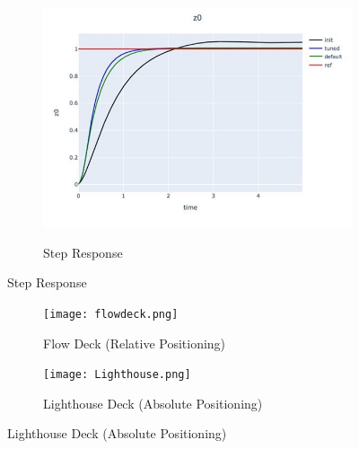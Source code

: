 \documentclass[../templateLTHtwocol.tex]{subfiles}
\begin{document}
\begin{figure}[H]
\begin{subfigure}[b]{0.2\textwidth}
		\label{fig:figpid3}
	\end{subfigure}
	\hfill
	\begin{subfigure}[b]{0.2\textwidth}
		\caption{Step Response}
		\includegraphics[width=\textwidth]{resources/pid/step_response_PID.jpg}
		\label{pid_step_response:fig}
	\end{subfigure}
\end{figure}

\begin{figure}[h]
	\centering
	\caption{Helix - Hardware Results}
	\begin{subfigure}[b]{0.4\textwidth}
		\caption{Flow Deck (Relative Positioning)}
		\texttt{[image: flowdeck.png]}
		\label{fig:figpid4}
	\end{subfigure}
	\hfill
	\begin{subfigure}[b]{0.4\textwidth}
		\caption{Lighthouse Deck (Absolute Positioning)}
		\texttt{[image: Lighthouse.png]}
		\label{fig:figpid5}
	\end{subfigure}
\end{figure}
\end{document}
